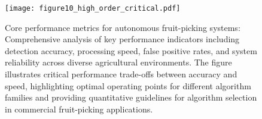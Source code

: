 \documentclass{ieeeaccess}
\begin{document}
\begin{figure}[htbp]
\centering
\texttt{[image: figure10\_high\_order\_critical.pdf]}
\caption{Core performance metrics for autonomous fruit-picking systems: Comprehensive analysis of key performance indicators including detection accuracy, processing speed, false positive rates, and system reliability across diverse agricultural environments. The figure illustrates critical performance trade-offs between accuracy and speed, highlighting optimal operating points for different algorithm families and providing quantitative guidelines for algorithm selection in commercial fruit-picking applications.}

\label{fig:future_directions_roadmap}
\end{figure}
\end{document}
